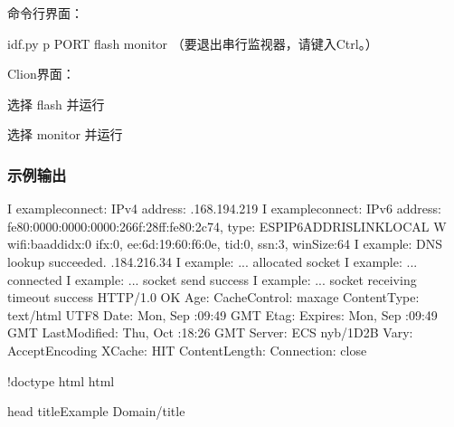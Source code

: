 \documentclass[a4paper,12pt,english]{sphinxmanual}
\begin{document}
{{\sphinxAtStartPar
命令行界面：

\sphinxAtStartPar
idf.py \sphinxhyphen{}p PORT flash monitor
（要退出串行监视器，请键入Ctrl\sphinxhyphen{}{]}。）

\sphinxAtStartPar
Clion界面：

\sphinxAtStartPar
选择 flash 并运行

\sphinxAtStartPar
选择 monitor 并运行


\subsubsection{示例输出}
\label{\detokenize{exp-esp32/http:id9}}
\begin{sphinxVerbatim}[commandchars=\\\{\}]
I  example\PYGZus{}connect: \PYGZhy{} IPv4 address: .168.194.219
I  example\PYGZus{}connect: \PYGZhy{} IPv6 address: fe80:0000:0000:0000:266f:28ff:fe80:2c74, type: ESP\PYGZus{}IP6\PYGZus{}ADDR\PYGZus{}IS\PYGZus{}LINK\PYGZus{}LOCAL
W  wifi:\PYGZlt{}ba\PYGZhy{}add\PYGZgt{}idx:0 ifx:0, ee:6d:19:60:f6:0e, tid:0, ssn:3, winSize:64
I  example: DNS lookup succeeded. .184.216.34
I  example: ... allocated socket
I  example: ... connected
I  example: ... socket send success
I  example: ...  socket receiving timeout success
HTTP/1.0  OK
Age: 
Cache\PYGZhy{}Control: max\PYGZhy{}age
Content\PYGZhy{}Type: text/html UTF\PYGZhy{}8
Date: Mon,  Sep  :09:49 GMT
Etag: 
Expires: Mon,  Sep  :09:49 GMT
Last\PYGZhy{}Modified: Thu,  Oct  :18:26 GMT
Server: ECS nyb/1D2B
Vary: Accept\PYGZhy{}Encoding
X\PYGZhy{}Cache: HIT
Content\PYGZhy{}Length: 
Connection: close

\PYGZlt{}!doctype html\PYGZgt{}
\PYGZlt{}html\PYGZgt{}

\PYGZlt{}head\PYGZgt{}
    \PYGZlt{}title\PYGZgt{}Example Domain\PYGZlt{}/title\PYGZgt{}


\end{sphinxVerbatim}}}
\end{document}
